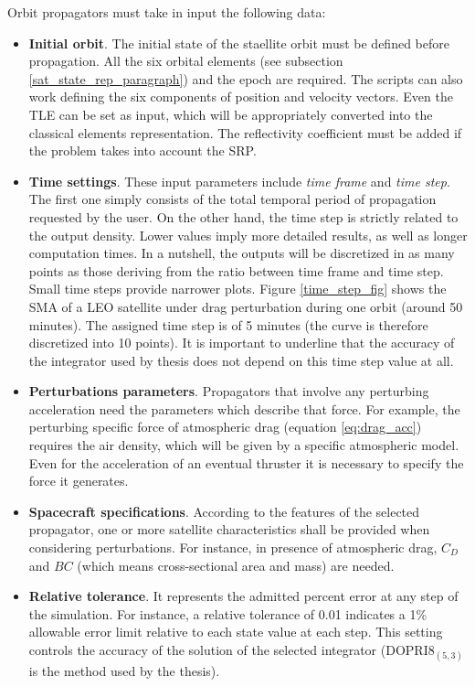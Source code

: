 Orbit propagators must take in input the following data:
\begin{itemize}
    \item \textbf{Initial orbit}. The initial state of the staellite orbit must be defined before propagation.
          All the six orbital elements (see subsection \ref{sat_state_rep_paragraph}) and the epoch are required. 
          The scripts can also work defining the six components of position and velocity vectors.
          Even the TLE can be set as input, which will be appropriately converted into the classical elements representation.  
          The reflectivity coefficient must be added if the problem takes into account the SRP.
    \item \textbf{Time settings}. These input parameters include \textit{time frame} and \textit{time step}.
          The first one simply consists of the total temporal period of propagation requested by the user.
          On the other hand, the time step is strictly related to the output density.
          Lower values imply more detailed results, as well as longer computation times.
          In a nutshell, the outputs will be discretized in as many points as those deriving from the ratio between time frame and time step.
          Small time steps provide narrower plots. 
          Figure \ref{time_step_fig} shows the SMA of a LEO satellite under drag perturbation during one orbit (around 50 minutes). 
          The assigned time step is of 5 minutes (the curve is therefore discretized into 10 points).
          It is important to underline that the accuracy of the integrator used by thesis does not depend on this time step value at all.
    \item \textbf{Perturbations parameters}. Propagators that involve any perturbing acceleration need the parameters which describe that force. 
          For example, the perturbing specific force of atmospheric drag (equation \ref{eq:drag_acc}) requires the air density, which will be given by a specific atmospheric model.
          Even for the acceleration of an eventual thruster it is necessary to specify the force it generates.
    \item \textbf{Spacecraft specifications}. According to the features of the selected propagator, one or more satellite characteristics shall be provided when considering perturbations.
          For instance, in presence of atmospheric drag, $C_D$ and $BC$ (which means cross-sectional area and mass) are needed. 
    \item \textbf{Relative tolerance}. It represents the admitted percent error at any step of the simulation. 
          For instance, a relative tolerance of 0.01 indicates a 1\% allowable error limit relative to each state value at each step.
          This setting controls the accuracy of the solution of the selected integrator \cite{rocha2018numerical} (DOPRI$8_{(5,3)}$ is the method used by the thesis).
\end{itemize}

